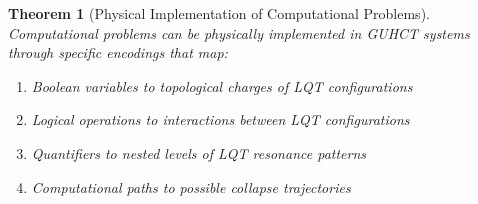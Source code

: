 \documentclass[11pt,a4paper]{article}
\newtheorem{theorem}{Theorem}[section]
\begin{document}
\begin{theorem}[Physical Implementation of Computational Problems]
\label{thm:physical_implementation}
Computational problems can be physically implemented in GUHCT systems through specific encodings that map:
\begin{enumerate}
    \item Boolean variables to topological charges of LQT configurations
    \item Logical operations to interactions between LQT configurations
    \item Quantifiers to nested levels of LQT resonance patterns
    \item Computational paths to possible collapse trajectories
\end{enumerate}
\end{theorem}
\end{document}
